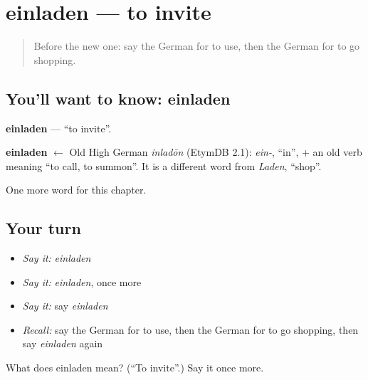 \section[einladen]{einladen — to invite}

\label{lesson:GE-C145-einladen}



\begin{quote}
Before the new one: say the German for to use, then the German for to go shopping.
\end{quote}

\subsection*{You'll want to know: einladen}
\textbf{einladen} — \textquotedblleft{}to invite\textquotedblright{}.

\begin{cousinweb}
\textbf{einladen} $\leftarrow$ Old High German \emph{inladōn} (EtymDB 2.1): \emph{ein-}, \textquotedblleft{}in\textquotedblright{}, + an old verb meaning \textquotedblleft{}to call, to summon\textquotedblright{}. It is a different word from \emph{Laden}, \textquotedblleft{}shop\textquotedblright{}.
\end{cousinweb}

\begin{grammarlens}[title={What you've built}]
One more word for this chapter.
\end{grammarlens}

\subsection*{Your turn}
\begin{itemize}
\raggedright
  \item \emph{Say it:} \emph{einladen}
  \item \emph{Say it:} \emph{einladen}, once more
  \item \emph{Say it:} say \emph{einladen}
  \item \emph{Recall:} say the German for to use, then the German for to go shopping, then say \emph{einladen} again
\end{itemize}

\begin{tcolorbox}[breakable,colback=teal!4,colframe=teal!35!black,title={Before you move on}]
What does einladen mean? (\textquotedblleft{}To invite\textquotedblright{}.) Say it once more.
\end{tcolorbox}
